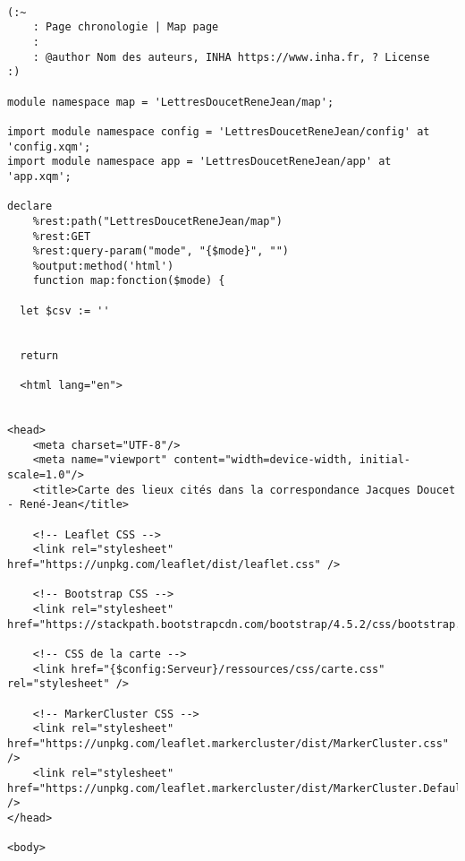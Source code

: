 \begin{verbatim}

(:~ 
    : Page chronologie | Map page
    :
    : @author Nom des auteurs, INHA https://www.inha.fr, ? License
:)

module namespace map = 'LettresDoucetReneJean/map';

import module namespace config = 'LettresDoucetReneJean/config' at 'config.xqm';
import module namespace app = 'LettresDoucetReneJean/app' at 'app.xqm';

declare
    %rest:path("LettresDoucetReneJean/map")
    %rest:GET
    %rest:query-param("mode", "{$mode}", "")
    %output:method('html')
    function map:fonction($mode) {
  
  let $csv := ''
  

  return
  
  <html lang="en">
  
  
<head>
    <meta charset="UTF-8"/>
    <meta name="viewport" content="width=device-width, initial-scale=1.0"/>
    <title>Carte des lieux cités dans la correspondance Jacques Doucet - René-Jean</title>

    <!-- Leaflet CSS -->
    <link rel="stylesheet" href="https://unpkg.com/leaflet/dist/leaflet.css" />

    <!-- Bootstrap CSS -->
    <link rel="stylesheet" href="https://stackpath.bootstrapcdn.com/bootstrap/4.5.2/css/bootstrap.min.css"/>

    <!-- CSS de la carte -->
    <link href="{$config:Serveur}/ressources/css/carte.css" rel="stylesheet" />

    <!-- MarkerCluster CSS -->
    <link rel="stylesheet" href="https://unpkg.com/leaflet.markercluster/dist/MarkerCluster.css" />
    <link rel="stylesheet" href="https://unpkg.com/leaflet.markercluster/dist/MarkerCluster.Default.css" />        
</head>

<body>


\end{verbatim}
